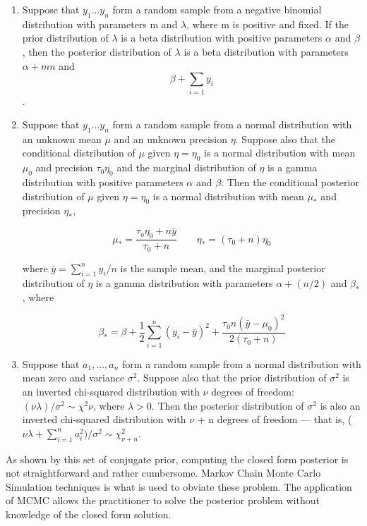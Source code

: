 \documentclass[letterpaper]{article}
\begin{document}
\begin{enumerate}
\item Suppose that $y_1...y_n$ form a random sample from a negative binomial
distribution with parameters m and $\lambda$, where m is positive and fixed. If the prior distribution of $\lambda$ is a beta distribution with positive parameters $\alpha$ and $\beta$, then the posterior distribution of $\lambda$ is a beta distribution with parameters $\alpha +mn$ and 
$$\beta+ \sum_{i=1} y_i$$.

\item Suppose that $y_1...y_n$ form a random sample from a normal distribution
with an unknown mean $\mu$ and an unknown precision $\eta$. Suppose also that the conditional distribution of $\mu$ given $\eta = \eta_0$ is a normal distribution with mean $\mu_0$ and precision $\tau_0\eta_0 $ and the marginal distribution of $\eta$ is a gamma distribution with positive parameters $\alpha$ and $\beta$. Then the conditional posterior distribution of $\mu$ given $\eta = \eta_0$ is a normal distribution with mean $\mu_*$ and precision $\eta_*$,

\begin{equation*}
\mu_*=\frac{\tau_o\eta_0+n\bar{y}}{\tau_0+n} \qquad \eta_*=(\tau_0+n)\eta_0
\end{equation*}

where $\bar{y} = \sum_{i=1}^{n} y_i/n$ is the sample mean, and the marginal posterior distribution of $\eta$ is a gamma distribution with parameters $\alpha + (n/2)$ and $\beta_*$, where

\begin{equation*}
\beta_*=\beta+\frac{1}{2}\sum_{i=1}^n(y_i-\bar{y})^2+\frac{\tau_0 n (\bar{y}-\mu_0)^2}{2(\tau_0+n)}
\end{equation*}

\item Suppose that $a_1, . . . , a_n$ form a random sample from a normal distribution with mean zero and variance $\sigma^2$. Suppose also that the prior distribution of $\sigma^2$ is an inverted chi-squared distribution with $\nu$ degrees of freedom: $(\nu \lambda)/\sigma^2 ∼ \chi^2 \nu $, where $\lambda > 0$. Then the posterior distribution of $\sigma^2$ is also an inverted chi-squared distribution with $\nu$ + n degrees of freedom — that is, ($\nu \lambda + \sum_{i=1}^{n} a_i^2 )/\sigma^2 ∼ \chi^2_{\nu+n}$.
\end{enumerate}

As shown by this set of conjugate prior, computing the closed form posterior is not straightforward and rather cumbersome. Markov Chain Monte Carlo Simulation techniques is what is used to obviate these problem. The application of MCMC allows the practitioner to solve the posterior problem without knowledge of the closed form solution.
\end{document}
